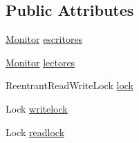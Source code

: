 \subsection*{Public Attributes}
\begin{DoxyCompactItemize}
\item 
\mbox{\hyperlink{classpecl3ignacioriberalocks_1_1_monitor}{Monitor}} \mbox{\hyperlink{classpecl3ignacioriberalocks_1_1_libro_a24ec713d35d88ddc71ea9ca21d8b93ac}{escritores}}
\item 
\mbox{\hyperlink{classpecl3ignacioriberalocks_1_1_monitor}{Monitor}} \mbox{\hyperlink{classpecl3ignacioriberalocks_1_1_libro_a9a3f7e435b4f83a7479dc1cdd7c79027}{lectores}}
\item 
Reentrant\+Read\+Write\+Lock \mbox{\hyperlink{classpecl3ignacioriberalocks_1_1_libro_a38eb9f3cc802c4e55a0f835ced96cae5}{lock}}
\item 
Lock \mbox{\hyperlink{classpecl3ignacioriberalocks_1_1_libro_a15ec43cc6993408553bd7637e6640294}{writelock}}
\item 
Lock \mbox{\hyperlink{classpecl3ignacioriberalocks_1_1_libro_ad72fa37a55ba59d03115de560a626433}{readlock}}
\end{DoxyCompactItemize}
